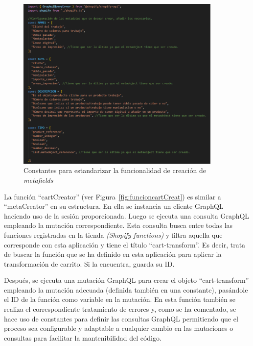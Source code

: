 \documentclass[11pt]{article}
\begin{document}
\begin{figure}[H]
    \centering
    \includegraphics[width=0.9\textwidth]{imagenes-back/metafieldCreatorConstantes1.png}
    \caption{\label{fig:constantesMetafields} Constantes para estandarizar la funcionalidad de creación de \textit{metafields} }
    \vspace{\fill}
\end{figure}

La función ``cartCreator'' (ver Figura~\ref{fig:funcioncartCreat}) es similar a ``metaCreator'' en su estructura. En ella se instancia un cliente GraphQL haciendo uso de la sesión
proporcionada. Luego se ejecuta una consulta GraphQL empleando la mutación correspondiente. Esta consulta 
busca entre todas las funciones registradas en la tienda \textit{(Shopify functions)} y filtra aquella que corresponde con esta aplicación y tiene el título ``cart-transform''.
Es decir, trata de buscar la función que se ha definido en esta aplicación para aplicar la transformación de carrito. Si la encuentra, guarda su ID.

Después, se ejecuta una mutación GraphQL para crear el objeto ``cart-transform'' empleando la mutación adecuada (definida también en una constante), pasándole
el ID de la función como variable en la mutación. En esta función también se realiza el correspondiente tratamiento de errores y, como se ha comentado,
se hace uso de constantes para definir las consultas GraphQL permitiendo que el proceso sea configurable y adaptable a cualquier cambio en las mutaciones
o consultas para facilitar la mantenibilidad del código.
\end{document}

